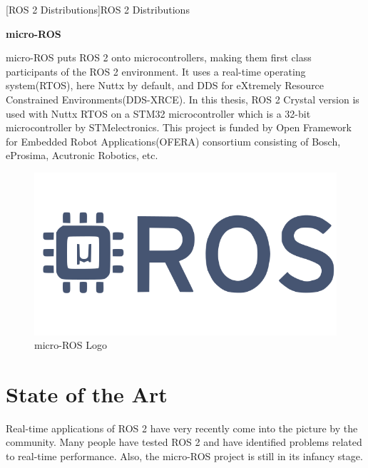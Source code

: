 \documentclass[%
xelatex,
	oneside,		%
	12pt,			%
	parskip=half,	%
	abstracton,
	chapterprefix=true%
    appendixprefix=true]
{scrbook}
\begin{document}
[ROS 2 Distributions]{ROS 2 Distributions\cite{ROS2distro}}
\label{fig:ROS2Distro}

\vspace*{1cm}

{\bfseries	 micro-ROS}
\vspace*{0.5cm}

micro-ROS puts ROS 2 onto microcontrollers, making them first class participants of the ROS 2 environment.\cite{uros}	
It uses a real-time operating system(RTOS), here Nuttx by default, and DDS for eXtremely Resource Constrained Environments(DDS-XRCE). In this thesis, ROS 2 Crystal version is used with Nuttx RTOS on a STM32 microcontroller which is a 32-bit microcontroller by STMelectronics. This project is funded by Open Framework for Embedded Robot Applications(OFERA) consortium consisting of Bosch, eProsima, Acutronic Robotics, etc. 

\begin{figure}[ht]
\begin{center}
\includegraphics[scale=.3]{fig/microROS-big-logo.png}
\caption[micro-ROS Logo]{micro-ROS Logo\cite{uroslogo}}
\label{fig:uros}
\end{center}
\end{figure} 
	 
	\chapter{State of the Art}	
		
		
\rofoot[\pagemark]{\pagemark}
	Real-time applications of ROS 2 have very recently come into the picture by the community. Many people have tested ROS 2 and have identified problems related to real-time performance. Also, the micro-ROS project is still in its infancy stage.
	
\end{document}
